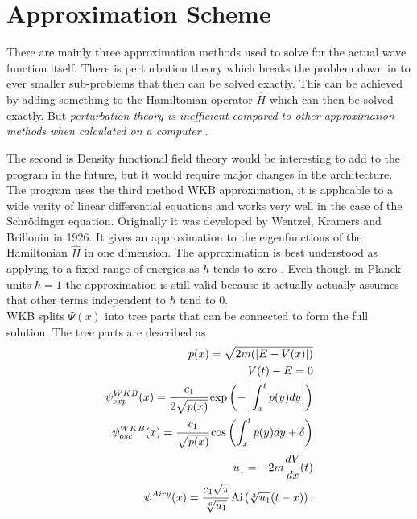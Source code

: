 \documentclass[11pt,DIV=10,final]{scrreprt} %
\begin{document}
\section{Approximation Scheme}\label{meth:wkb:approximation-scheme}
There are mainly three approximation methods used to solve for the actual wave function itself. There is perturbation theory which breaks the problem down in to ever smaller sub-problems that then can be
solved exactly. This can be achieved by adding something to the Hamiltonian operator $\hat{H}$ which can then be solved exactly. But \textit{perturbation theory is inefficient compared to other approximation
methods when calculated on a computer} \citep[Introduction]{van2014density}.

The second is Density functional field theory would be interesting to add to the program in the future, but it would require major changes in the architecture.
\\

The program uses the third method WKB approximation, it is applicable to a wide verity of linear differential equations and works very well in the case of the Schrödinger equation.
Originally it was developed by Wentzel, Kramers and Brillouin in 1926. It gives an approximation to the eigenfunctions of the Hamiltonian $\hat{H}$ in one dimension. The approximation is best
understood as applying to a fixed range of energies as $\hbar$ tends to zero \citep[p.~305]{hall2013quantum}. Even though in Planck units $\hbar = 1$ the approximation is still valid because it actually
actually assumes that other terms independent to $\hbar$ tend to 0.
\\

WKB splits $\Psi(x)$ into tree parts that can be connected to form the full solution. The tree parts are described as
\begin{align}
\label{eq:wkb:momentum}
  p(x) = \sqrt{2m(|E - V(x)|)} \\
\label{eq:wkb:t}
  V(t) - E = 0 \\
\label{eq:wkb:exp}
  \psi^{WKB}_{exp}(x)= \cfrac{c_{1}}{2 \sqrt{p(x)}} \exp\left(-\left|\int_{x}^{t}p(y) dy\right|\right) \\
\label{eq:wkb:osc}
  \psi^{WKB}_{osc} (x)= \cfrac{c_{1}}{\sqrt{p(x)}} \cos\left(\int_{x}^{t}p(y) dy + \delta \right) \\
  u_{1} = -2 m \cfrac{dV}{dx}(t) \\
\label{eq:airy}
  \psi^{Airy}(x) = \cfrac{c_{1} \sqrt{\pi}}{\sqrt[6]{u_{1}}} \operatorname{Ai}\left(\sqrt[3]{u_{1}} (t - x)\right).
\end{align}
\end{document}
